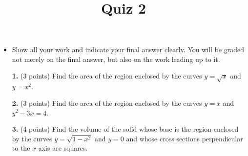 \documentclass[12pt]{amsart}
\title{Quiz 2}
\begin{document}
\maketitle
\thispagestyle{fancy}

\begin{itemize}
\item Show all your work and indicate your final
answer clearly. You will be graded not merely on the final answer, but also on the work leading up to it.
\end{itemize}
\vskip0.25in
\begin{enumerate}


\item[\textbf{1. }] (3 points) Find the area of the region enclosed by the curves $y = \sqrt{x}$ and $y = x^2$.

\vskip 2in

\item[\textbf{2. }](3 points) Find the area of the region enclosed by the curves $y = x$ and $y^2 - 3x = 4$.
 
\vskip 2in

\item[\textbf{3. }] (4 points) Find the volume of the solid whose base is the region enclosed by the curves $y = \sqrt{1 - x^2}$ and $y = 0$ and whose cross sections perpendicular to the $x$-axis are squares.

\end{enumerate}
\end{document}
